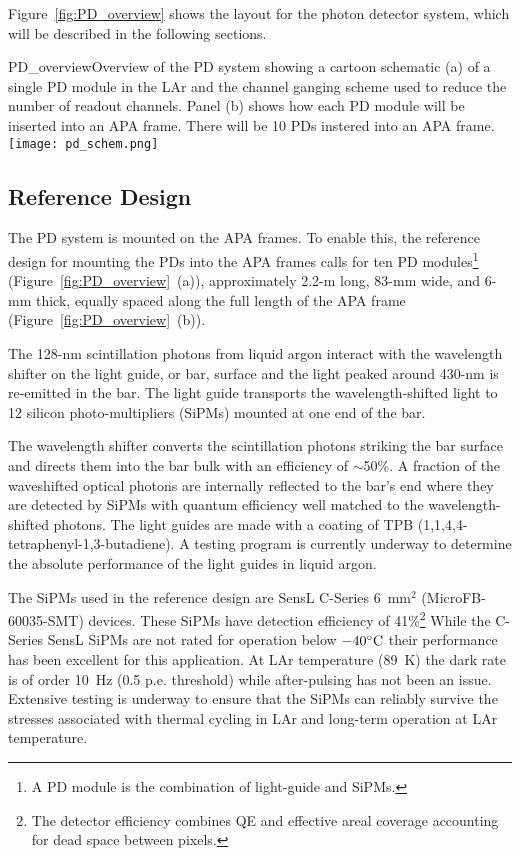 Figure~\ref{fig:PD_overview} shows the layout for the photon detector
system, which will be described in the following sections.
\begin{cdrfigure}[PD Overview]{PD_overview}{Overview of the PD
    system showing a cartoon schematic (a) of a single PD module
    in the LAr and the channel ganging scheme used to reduce the
    number of readout channels. Panel (b) shows how each PD module
    will be inserted into an APA frame. There will be 10 PDs instered
    into an APA frame.}
\texttt{[image: pd\_schem.png]}
\end{cdrfigure}

\subsection{Reference Design}
\label{sec:detectors-fd-ref-pd-refsystem}   %

The PD system is mounted on the APA frames.  To enable this, the
reference design for mounting the PDs into the APA frames calls for
ten PD modules\footnote{A PD module is the combination of light-guide
and SiPMs.} (Figure~\ref{fig:PD_overview}~(a)), approximately 2.2-m
long, 83-mm wide, and 6-mm thick, equally spaced along the full length
of the APA frame (Figure~\ref{fig:PD_overview}~(b)).

The 128-nm scintillation photons from liquid argon interact with the
wavelength shifter on the light guide, or bar, surface and the light
peaked around 430-nm is re-emitted in the bar. The light guide
transports the wavelength-shifted light to 12 silicon
photo-multipliers (SiPMs) mounted at one end of the bar.

The wavelength shifter converts the scintillation photons striking the
bar surface and directs them into the bar bulk with an efficiency of
$\sim$50\%.  A fraction of the waveshifted optical photons are
internally reflected to the bar's end where they are detected by SiPMs
with quantum efficiency well matched to the wavelength-shifted
photons. The light guides are made with a coating of TPB
(1,1,4,4-tetraphenyl-1,3-butadiene). A testing program is currently
underway to determine the absolute performance of the light guides in
liquid argon.

The SiPMs used in the reference design are SensL C-Series 6~mm$^2$
(MicroFB-60035-SMT) devices. These SiPMs have detection efficiency of
41\%\footnote{The detector efficiency combines QE and effective areal
  coverage accounting for dead space between pixels.} While the
C-Series SensL SiPMs are not rated for operation below
$-40^{\circ}{\rm C}$ their performance has been excellent for this
application. At LAr temperature (89~K) the dark rate is of order 10~Hz
(0.5 p.e. threshold) while after-pulsing has not been an
issue. Extensive testing is underway to ensure that the SiPMs can
reliably survive the stresses associated with thermal cycling in LAr
and long-term operation at LAr temperature.


